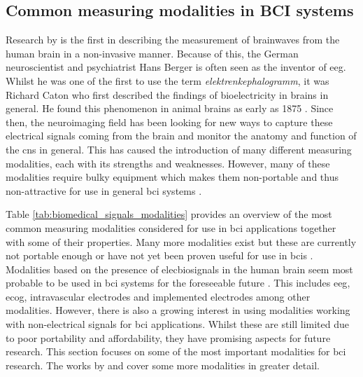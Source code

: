 
\subsection{Common measuring modalities in BCI systems}
\label{subsec:biomedical_signals_measuring_brain_modalities}

Research by \citet{human_eeg_discovery} is the first in describing the measurement of brainwaves from the human brain in a non-invasive manner.
Because of this, the German neuroscientist and psychiatrist Hans Berger is often seen as the inventor of \gls{eeg}.
Whilst he was one of the first to use the term \textit{elektrenkephalogramm}, it was Richard Caton who first described the findings of bioelectricity in brains in general.
He found this phenomenon in animal brains as early as 1875 \citep{first_eeg}.
Since then, the neuroimaging field has been looking for new ways to capture these electrical signals coming from the brain and monitor the anatomy and function of the \gls{cns} in general.
This has caused the introduction of many different measuring modalities, each with its strengths and weaknesses.
However, many of these modalities require bulky equipment which makes them non-portable and thus non-attractive for use in general \gls{bci} systems \citep{modalities_review1}.

Table \ref{tab:biomedical_signals_modalities} provides an overview of the most common measuring modalities considered for use in \gls{bci} applications together with some of their properties.
Many more modalities exist but these are currently not portable enough or have not yet been proven useful for use in \glspl{bci} \citep{modalities_review1, modalities_review2}.
Modalities based on the presence of \glspl{elecbiosignal} in the human brain seem most probable to be used in \gls{bci} systems for the foreseeable future \citep{modalities_review2}.
This includes \gls{eeg}, \gls{ecog}, intravascular electrodes and implemented electrodes among other modalities.
However, there is also a growing interest in using modalities working with non-electrical signals for \gls{bci} applications.
Whilst these are still limited due to poor portability and affordability, they have promising aspects for future research.
This section focuses on some of the most important modalities for \gls{bci} research.
The works by \citet{modalities_review1} and \citet{modalities_review2} cover some more modalities in greater detail.


